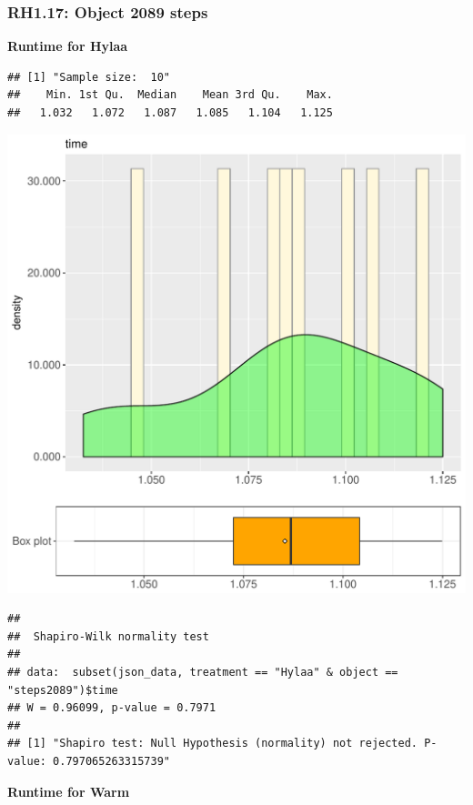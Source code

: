 \documentclass{article}\usepackage[]{graphicx}\usepackage[]{color}
\makeatletter
\def\maxwidth{ %
  \ifdim\Gin@nat@width>\linewidth
    \linewidth
  \else
    \Gin@nat@width
  \fi
}
\newenvironment{kframe}{%
 \def\at@end@of@kframe{}%
 \ifinner\ifhmode%
  \def\at@end@of@kframe{\end{minipage}}%
  \begin{minipage}{\columnwidth}%
 \fi\fi%
 \def\FrameCommand##1{\hskip\@totalleftmargin \hskip-\fboxsep
 \colorbox{shadecolor}{##1}\hskip-\fboxsep
     \hskip-\linewidth \hskip-\@totalleftmargin \hskip\columnwidth}%
 \MakeFramed {\advance\hsize-\width
   \@totalleftmargin\z@ \linewidth\hsize
   \@setminipage}}%
 {\par\unskip\endMakeFramed%
 \at@end@of@kframe}
\newenvironment{knitrout}{}{} %
\makeatother
\begin{document}
\subsubsection{RH1.17: Object 2089 steps}

 \textbf{Runtime for Hylaa}
\begin{knitrout}
\color{fgcolor}\begin{kframe}
\begin{verbatim}
## [1] "Sample size:  10"
##    Min. 1st Qu.  Median    Mean 3rd Qu.    Max. 
##   1.032   1.072   1.087   1.085   1.104   1.125
\end{verbatim}
\end{kframe}
\includegraphics[width=\maxwidth]{figure/RH1_Hylaa_steps2089-1} 
\begin{kframe}\begin{verbatim}
## 
## 	Shapiro-Wilk normality test
## 
## data:  subset(json_data, treatment == "Hylaa" & object == "steps2089")$time
## W = 0.96099, p-value = 0.7971
## 
## [1] "Shapiro test: Null Hypothesis (normality) not rejected. P-value: 0.797065263315739"
\end{verbatim}
\end{kframe}
\end{knitrout}
 \textbf{Runtime for Warm}
\end{document}
